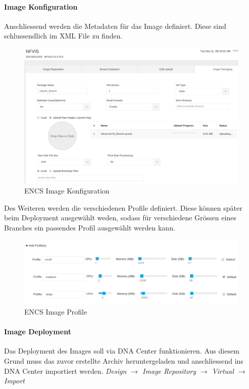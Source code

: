 \paragraph{Image Konfiguration}

Anschliessend werden die Metadaten für das Image definiert. Diese sind schlussendlich im XML File zu finden.

\begin{figure}[H]
	\centering
	\includegraphics[width=0.8\linewidth]{img/Absicherung/ENCS-Image-Creation.png}
	\caption{ENCS Image Konfiguration}
	\label{fig:ENCS Image Konfiguration}
\end{figure}

Des Weiteren werden die verschiedenen Profile definiert. Diese können später beim Deployment ausgewählt weden, sodass für verschiedene Grössen eines Branches ein passendes Profil ausgewählt werden kann.

\begin{figure}[H]
	\centering
	\includegraphics[width=0.8\linewidth]{img/Absicherung/ENCS-Image-Profile.png}
	\caption{ENCS Image Profile}
	\label{fig:ENCS Image Profile}
\end{figure}

\paragraph{Image Deployment}

Das Deployment des Images soll via DNA Center funktionieren. Aus diesem Grund muss das zuvor erstellte Archiv heruntergeladen und anschliessend ins DNA Center importiert werden. \textit{Design $\rightarrow$ Image Repository $\rightarrow$ Virtual $\rightarrow$ Import}

